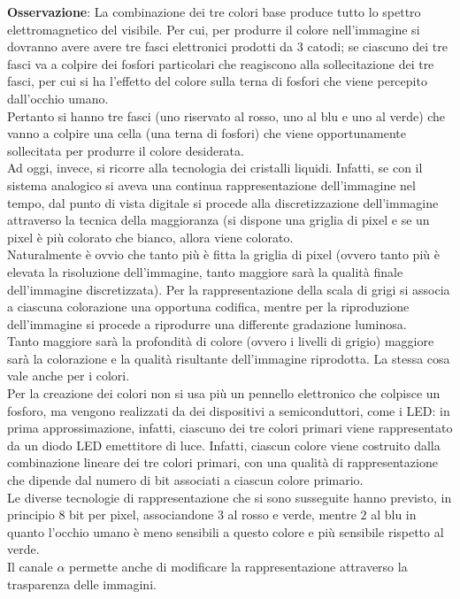 \documentclass[a4paper]{extarticle}
\begin{document}
\vspace{1em}
\noindent
\textbf{Osservazione}: La combinazione dei tre colori base produce tutto lo spettro elettromagnetico del visibile. Per cui, per produrre il colore nell'immagine si dovranno avere avere tre fasci elettronici prodotti da \(3\) catodi; se ciascuno dei tre fasci va a colpire dei fosfori particolari che reagiscono alla sollecitazione dei tre fasci, per cui si ha l'effetto del colore sulla terna di fosfori che viene percepito dall'occhio umano.\\
Pertanto si hanno tre fasci (uno riservato al rosso, uno al blu e uno al verde) che vanno a colpire una cella (una terna di fosfori) che viene opportunamente sollecitata per produrre il colore desiderata.\\
Ad oggi, invece, si ricorre alla tecnologia dei cristalli liquidi. Infatti, se con il sistema analogico si aveva una continua rappresentazione dell'immagine nel tempo, dal punto di vista digitale si procede alla discretizzazione dell'immagine attraverso la tecnica della maggioranza (si dispone una griglia di pixel e se un pixel è più colorato che bianco, allora viene colorato.\\
Naturalmente è ovvio che tanto più è fitta la griglia di pixel (ovvero tanto più è elevata la risoluzione dell'immagine, tanto maggiore sarà la qualità finale dell'immagine discretizzata). Per la rappresentazione della scala di grigi si associa a ciascuna colorazione una opportuna codifica, mentre per la riproduzione dell'immagine si procede a riprodurre una differente gradazione luminosa.\\
Tanto maggiore sarà la profondità di colore (ovvero i livelli di grigio) maggiore sarà la colorazione e la qualità risultante dell'immagine riprodotta. La stessa cosa vale anche per i colori.\\
Per la creazione dei colori non si usa più un pennello elettronico che colpisce un fosforo, ma vengono realizzati da dei dispositivi a semiconduttori, come i LED: in prima approssimazione, infatti, ciascuno dei tre colori primari viene rappresentato da un diodo LED emettitore di luce. Infatti, ciascun colore viene costruito dalla combinazione lineare dei tre colori primari, con una qualità di rappresentazione che dipende dal numero di bit associati a ciascun colore primario.\\
Le diverse tecnologie di rappresentazione che si sono susseguite hanno previsto, in principio \(8\) bit per pixel, associandone \(3\) al rosso e verde, mentre \(2\) al blu in quanto l'occhio umano è meno sensibili a questo colore e più sensibile rispetto al verde.\\
Il canale \(\alpha\) permette anche di modificare la rappresentazione attraverso la trasparenza delle immagini.
\end{document}
